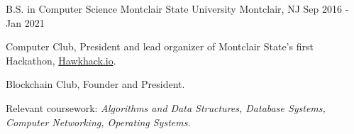 

\begin{cventries}

  \cventry
    {B.S. in Computer Science} %
    {Montclair State University} %
    {Montclair, NJ} %
    {Sep 2016 - Jan 2021} %
    {
        \begin{cvitems} %
            \item Computer Club, President and lead organizer of Montclair State's first Hackathon, \href{www.hawkhack.io}{Hawkhack.io}.
            \item Blockchain Club, Founder and President.
            \item Relevant coursework: {\textit{Algorithms and Data Structures, Database Systems, Computer Networking, Operating Systems.}}
      \end{cvitems}
    }
\vspace{-0.4cm}
\end{cventries}
